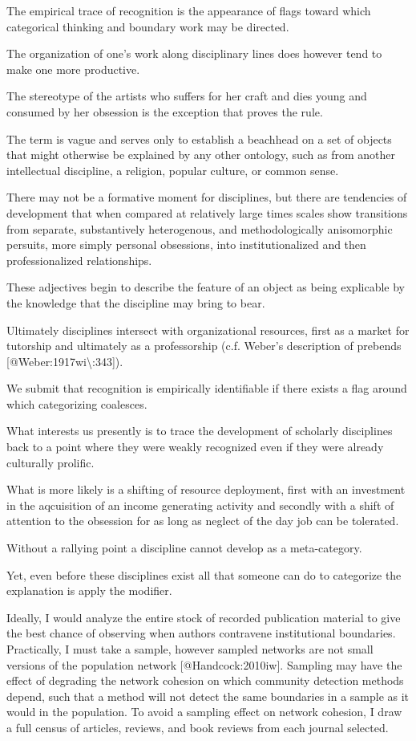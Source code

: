 \documentclass [PhD] {uclathes}
\begin{document}
The empirical trace of recognition is the appearance of flags toward
which categorical thinking and boundary work may be directed.

The organization of one's work along disciplinary lines does however
tend to make one more productive.

The stereotype of the artists who suffers for her craft and dies young
and consumed by her obsession is the exception that proves the rule.

The term is vague and serves only to establish a beachhead on a set of
objects that might otherwise be explained by any other ontology, such as
from another intellectual discipline, a religion, popular culture, or
common sense.

There may not be a formative moment for disciplines, but there are
tendencies of development that when compared at relatively large times
scales show transitions from separate, substantively heterogenous, and
methodologically anisomorphic persuits, more simply personal obsessions,
into institutionalized and then professionalized relationships.

These adjectives begin to describe the feature of an object as being
explicable by the knowledge that the discipline may bring to bear.

Ultimately disciplines intersect with organizational resources, first as
a market for tutorship and ultimately as a professorship (c.f. Weber's
description of prebends {[}@Weber:1917wi\textbackslash{}:343{]}).

We submit that recognition is empirically identifiable if there exists a
flag around which categorizing coalesces.

What interests us presently is to trace the development of scholarly
disciplines back to a point where they were weakly recognized even if
they were already culturally prolific.

What is more likely is a shifting of resource deployment, first with an
investment in the aqcuisition of an income generating activity and
secondly with a shift of attention to the obsession for as long as
neglect of the day job can be tolerated.

Without a rallying point a discipline cannot develop as a meta-category.

Yet, even before these disciplines exist all that someone can do to
categorize the explanation is apply the modifier.

Ideally, I would analyze the entire stock of recorded publication
material to give the best chance of observing when authors contravene
institutional boundaries. Practically, I must take a sample, however
sampled networks are not small versions of the population network
{[}@Handcock:2010iw{]}. Sampling may have the effect of degrading the
network cohesion on which community detection methods depend, such that
a method will not detect the same boundaries in a sample as it would in
the population. To avoid a sampling effect on network cohesion, I draw a
full census of articles, reviews, and book reviews from each journal
selected.
\end{document}
